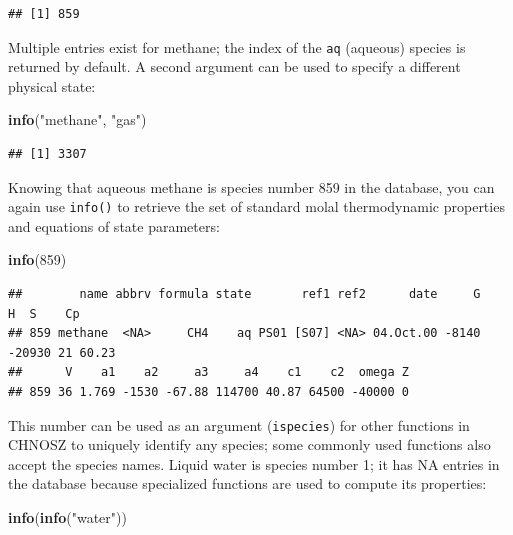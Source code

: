\documentclass[]{tufte-handout}
\newenvironment{Shaded}{}{}
\newcommand{\KeywordTok}[1]{\textcolor[rgb]{0.00,0.44,0.13}{\textbf{#1}}}
\newcommand{\DecValTok}[1]{\textcolor[rgb]{0.25,0.63,0.44}{#1}}
\newcommand{\StringTok}[1]{\textcolor[rgb]{0.25,0.44,0.63}{#1}}
\newcommand{\NormalTok}[1]{#1}
\begin{document}
\begin{verbatim}
## [1] 859
\end{verbatim}

Multiple entries exist for methane; the index of the \texttt{aq}
(aqueous) species is returned by default. A second argument can be used
to specify a different physical state:

\begin{Shaded}
\begin{Highlighting}[]
\KeywordTok{info}\NormalTok{(}\StringTok{"methane"}\NormalTok{, }\StringTok{"gas"}\NormalTok{)}
\end{Highlighting}
\end{Shaded}

\begin{verbatim}
## [1] 3307
\end{verbatim}

Knowing that aqueous methane is species number 859 in the database, you
can again use {\texttt{info()}} to retrieve the set of standard molal
thermodynamic properties and equations of state parameters:

\begin{Shaded}
\begin{Highlighting}[]
\KeywordTok{info}\NormalTok{(}\DecValTok{859}\NormalTok{)}
\end{Highlighting}
\end{Shaded}

\begin{verbatim}
##        name abbrv formula state       ref1 ref2      date     G      H  S    Cp
## 859 methane  <NA>     CH4    aq PS01 [S07] <NA> 04.Oct.00 -8140 -20930 21 60.23
##      V    a1    a2     a3     a4    c1    c2  omega Z
## 859 36 1.769 -1530 -67.88 114700 40.87 64500 -40000 0
\end{verbatim}

This number can be used as an argument (\texttt{ispecies}) for other
functions in CHNOSZ to uniquely identify any species; some commonly used
functions also accept the species names. Liquid water is species number
1; it has NA entries in the database because specialized functions are
used to compute its properties:

\begin{Shaded}
\begin{Highlighting}[]
\KeywordTok{info}\NormalTok{(}\KeywordTok{info}\NormalTok{(}\StringTok{"water"}\NormalTok{))}
\end{Highlighting}
\end{Shaded}
\end{document}
